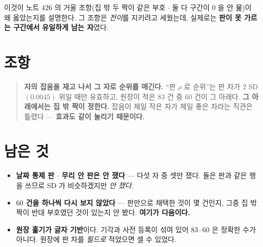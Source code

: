 \documentclass[11pt]{article}
\begin{document}
이것이 노트 $426$ 의 거울 조항(집 밖 두 짝이 같은 부호 $\cdot$ 둘 다
구간이 $0$ 을 안 묾)이 왜 옳았는지를 설명한다. 그 조항은 \emph{전이}를
지키려고 세웠는데, 실제로는 \textbf{판이 못 가르는 구간에서 유일하게
남는 자}였다.

\section*{조항}

\begin{quote}
\textbf{자의 잡음을 재고 나서 그 자로 순위를 매긴다.} ``판 $\rho$ 로
순위''는 판 차가 $2$ SD $(0.0045)$ 위일 때만 유효하고, 원장이 적은
$83$ 건 중 $60$ 건이 그 아래다. \textbf{그 아래에서는 집 밖 짝이 정한다.}
잡음이 제일 작은 자가 제일 좋은 자라는 직관은 틀렸다 --- \textbf{효과도
같이 눌리기 때문이다.}
\end{quote}

\section*{남은 것}

\begin{itemize}
\item \textbf{날짜 통제 판 $\cdot$ 무리 안 판은 안 쟀다} --- 다섯 자 중
셋만 쟀다. 둘은 판과 같은 행을 쓰므로 SD 가 비슷하겠지만 \emph{안 쟀다.}
\item \textbf{$60$ 건을 하나씩 다시 보지 않았다} --- 판만으로 채택한
것이 몇 건인지, 그중 집 밖 짝이 반대 부호였던 것이 있는지 안 봤다.
\textbf{여기가 다음이다.}
\item \textbf{원장 훑기가 글자 기반}이다. 기각과 사전 등록이 섞여 있어
$83 \cdot 60$ 은 정확한 수가 아니다. 원장에 판 차를 \emph{필드로}
적었으면 셀 수 있었다.
\end{itemize}
\end{document}
